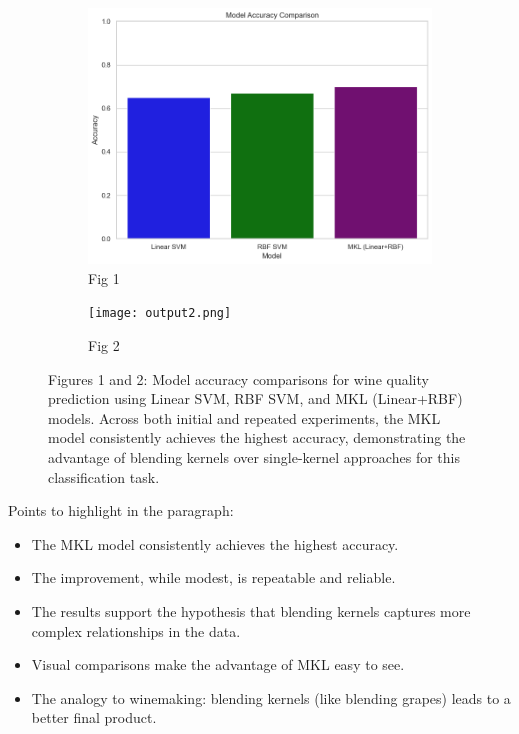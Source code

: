 \documentclass[11pt]{article}
\begin{document}
\begin{figure}[htbp]
    \centering
    \begin{subfigure}[b]{0.45\textwidth}
        \centering
        \includegraphics[width=\textwidth]{output1.png}
        \caption{Fig 1}
        \label{fig:subA}
    \end{subfigure}
    \hfill
    \begin{subfigure}[b]{0.45\textwidth}
        \centering
        \texttt{[image: output2.png]}
        \caption{Fig 2}
        \label{fig:subB}
    \end{subfigure}
    \caption{Figures 1 and 2: Model accuracy comparisons for wine quality prediction using Linear SVM, RBF SVM, and MKL (Linear+RBF) models. Across both initial and repeated experiments, the MKL model consistently achieves the highest accuracy, demonstrating the advantage of blending kernels over single-kernel approaches for this classification task.}
    \label{fig:main}
\end{figure}



Points to highlight in the paragraph:
\begin{itemize}
  \item The MKL model consistently achieves the highest accuracy.
  \item The improvement, while modest, is repeatable and reliable.
  \item The results support the hypothesis that blending kernels captures more complex relationships in the data.
  \item Visual comparisons make the advantage of MKL easy to see.
  \item The analogy to winemaking: blending kernels (like blending grapes) leads to a better final product.
\end{itemize}
\end{document}
